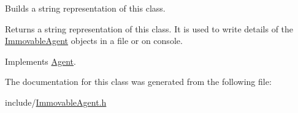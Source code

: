 Builds a string representation of this class. \begin{DoxyReturn}{Returns}
a string representation of this class. It is used to write details of the \hyperlink{class_immovable_agent}{Immovable\+Agent} objects in a file or on console. 
\end{DoxyReturn}


Implements \hyperlink{class_agent_a44f291596d10c7878b0641d6ec156328}{Agent}.



The documentation for this class was generated from the following file\+:\begin{DoxyCompactItemize}
\item 
include/\hyperlink{_immovable_agent_8h}{Immovable\+Agent.\+h}\end{DoxyCompactItemize}
